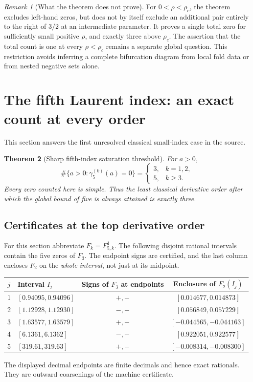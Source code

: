 \documentclass[11pt]{article}
\numberwithin{equation}{section}
\newtheorem{theorem}{Theorem}[section]
\theoremstyle{definition}\newtheorem{definition}[theorem]{Definition}
\theoremstyle{remark}\newtheorem{remark}[theorem]{Remark}
\begin{document}
\begin{remark}[What the theorem does not prove]
For $0<\rho<\rho_c$, the theorem excludes left-hand zeros, but does not by itself exclude an additional pair entirely to the right of $3/2$ at an intermediate parameter. It proves a single total zero for sufficiently small positive $\rho$, and exactly three above $\rho_c$. The assertion that the total count is one at every $\rho<\rho_c$ remains a separate global question. This restriction avoids inferring a complete bifurcation diagram from local fold data or from nested negative sets alone.
\end{remark}

\section{The fifth Laurent index: an exact count at every order}\label{sec:n5}
This section answers the first unresolved classical small-index case in the source.

\begin{theorem}[Sharp fifth-index saturation threshold]\label{thm:n5}
For $a>0$,
\begin{equation}\label{eq:n5count}
\boxed{\#\{a>0:\gamma_5^{(k)}(a)=0\}=
\begin{cases}
3,&k=1,2,\\
5,&k\geq3.
\end{cases}}
\end{equation}
Every zero counted here is simple. Thus the least classical derivative order after which the global bound of five is always attained is exactly three.
\end{theorem}

\subsection{Certificates at the top derivative order}
For this section abbreviate $F_k=F_{5,k}^{1}$. The following disjoint rational intervals contain the five zeros of $F_3$. The endpoint signs are certified, and the last column encloses $F_2$ on the \emph{whole interval}, not just at its midpoint.
\begin{center}\small
\begin{tabular}{clcc}
\toprule
$j$ & Interval $I_j$ & Signs of $F_3$ at endpoints & Enclosure of $F_2(I_j)$\\
\midrule
1 & $[0.94095,0.94096]$ & $+,-$ & $[0.014677,0.014873]$\\
2 & $[1.12928,1.12930]$ & $-,+$ & $[0.056849,0.057229]$\\
3 & $[1.63577,1.63579]$ & $+,-$ & $[-0.044565,-0.044163]$\\
4 & $[6.1361,6.1362]$ & $-,+$ & $[0.922051,0.922577]$\\
5 & $[319.61,319.63]$ & $+,-$ & $[-0.008314,-0.008300]$\\
\bottomrule
\end{tabular}
\end{center}
The displayed decimal endpoints are finite decimals and hence exact rationals. They are outward coarsenings of the machine certificate.
\end{document}
